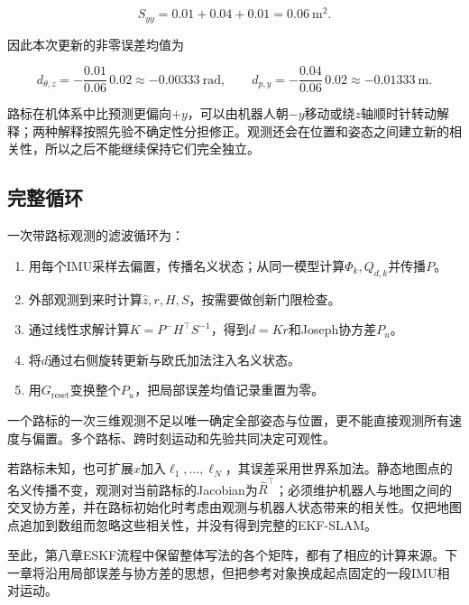 \begin{equation*}
S_{yy}=0.01+0.04+0.01=0.06\ \mathrm{m}^2.
\end{equation*}

因此本次更新的非零误差均值为

\begin{equation*}
d_{\theta,z}=-\frac{0.01}{0.06}\,0.02
             \approx-0.00333\ \mathrm{rad},
 \qquad
 d_{p,y}=-\frac{0.04}{0.06}\,0.02
             \approx-0.01333\ \mathrm m.
\end{equation*}

路标在机体系中比预测更偏向$+y$，可以由机器人朝$-y$移动或绕$z$轴顺时针转动解释；两种解释按照先验不确定性分担修正。观测还会在位置和姿态之间建立新的相关性，所以之后不能继续保持它们完全独立。

\subsection{完整循环}

一次带路标观测的滤波循环为：

\begin{enumerate}

\item 用每个IMU采样去偏置，传播名义状态；从同一模型计算$\Phi_k,Q_{d,k}$并传播$P$。

\item 外部观测到来时计算$\hat z,r,H,S$，按需要做创新门限检查。

\item 通过线性求解计算$K=P^-H^\top S^{-1}$，得到$d=Kr$和Joseph协方差$P_u$。

\item 将$d$通过右侧旋转更新与欧氏加法注入名义状态。

\item 用$G_{\mathrm{reset}}$变换整个$P_u$，把局部误差均值记录重置为零。

\end{enumerate}

一个路标的一次三维观测不足以唯一确定全部姿态与位置，更不能直接观测所有速度与偏置。多个路标、跨时刻运动和先验共同决定可观性。

若路标未知，也可扩展$x$加入$\ell_1,\ldots,\ell_N$，其误差采用世界系加法。静态地图点的名义传播不变，观测对当前路标的Jacobian为$\hat R^\top$；必须维护机器人与地图之间的交叉协方差，并在路标初始化时考虑由观测与机器人状态带来的相关性。仅把地图点追加到数组而忽略这些相关性，并没有得到完整的EKF-SLAM。

至此，第八章ESKF流程中保留整体写法的各个矩阵，都有了相应的计算来源。下一章将沿用局部误差与协方差的思想，但把参考对象换成起点固定的一段IMU相对运动。

